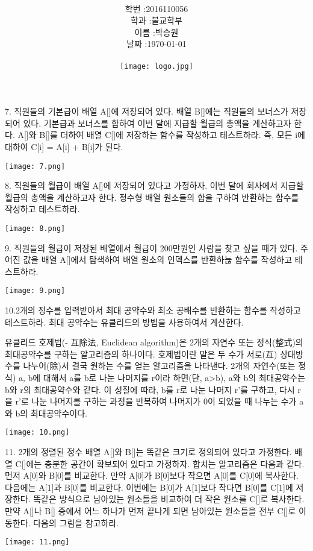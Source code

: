 \documentclass[11pt,a4paper]{article}
\title{
	\centering
	\pgfornament[width=12cm,color=teal]{84}\\
	\vspace{1cm}
	\fontsize{50}{50} \selectfont {기초 프로그래밍 실습\\11월 4주차}\\
		\pgfornament[width=12cm,color=teal]{88}\\
	\vfill}
\author{
	\LARGE
	\begin{tabular}{rl}
		\hline
		학번 : & 2016110056\\ 
		학과 : & 불교학부 \\
		이름 : & 박승원\\
		날짜 : & \today\\
		\hline
	\end{tabular}\vspace{2cm}
	\\
\texttt{[image: logo.jpg]}
	}
\date{}
\begin{document}
\maketitle
{}
\noindent
\lstset{language=C++, columns=flexible, tabsize=4, frame=shadowbox, showstringspaces=false, breaklines=true, upquote=true, basicstyle=\normalsize}
\begin{enumerate}
7. 직원들의 기본급이 배열 A[]에 저장되어 있다. 배열 B[]에는 직원들의 보너스가 저장되어 있다. 기본급과 보너스를 합하여 이번 달에 지급할 월급의 총액을 계산하고자 한다. A[]와 B[]를 더하여 배열 C[]에 저장하는 함수를 작성하고 테스트하라. 즉, 모든 i에 대하여 C[i] = A[i] + B[i]가 된다.

\texttt{[image: 7.png]}

8. 직원들의 월급이 배열 A[]에 저장되어 있다고 가정하자. 이번 달에 회사에서 지급할 월급의 총액을 계산하고자 한다. 정수형 배열 원소들의 합을 구하여 반환하는 함수를 작성하고 테스트하라.

\texttt{[image: 8.png]}

9. 직원들의 월급이 저장된 배열에서 월급이 200만원인 사람을 찾고 싶을 때가 있다. 주어진 값을 배열 A[]에서 탐색하여 배열 원소의 인덱스를 반환하늖 함수를 작성하고 테스트하라.

\texttt{[image: 9.png]}

10.2개의 정수를 입력받아서 최대 공약수와 최소 공배수를 반환하는 함수를 작성하고 테스트하라. 
최대 공약수는 유클리드의 방법을 사용하여서 계산한다.

유클리드 호제법(- 互除法, Euclidean algorithm)은 2개의 자연수 또는 정식(整式)의 최대공약수를 구하는 알고리즘의 하나이다. 
호제법이란 말은 두 수가 서로(互) 상대방 수를 나누어(除)서 결국 원하는 수를 얻는 알고리즘을 나타낸다. 2개의 자연수(또는 정식) a, b에 대해서 a를 b로 나눈 나머지를 r이라 하면(단, a>b), a와 b의 최대공약수는 b와 r의 최대공약수와 같다. 이 성질에 따라, b를 r로 나눈 나머지 r'를 구하고, 다시 r을 r'로 나눈 나머지를 구하는 과정을 반복하여 나머지가 0이 되었을 때 나누는 수가 a와 b의 최대공약수이다.

\texttt{[image: 10.png]}

11. 2개의 정렬된 정수 배열 A[]와 B[]는 똑같은 크기로 정의되어 있다고 가정한다. 
배열 C[]에는 충분한 공간이 확보되어 있다고 가정하자. 합치는 알고리즘은 다음과 같다. 
먼저 A[0]와 B[0]를 비교한다. 
만약 A[0]가 B[0]보다 작으면 A[0]를 C[0]에 복사한다.
다음에는 A[1]과 B[0]를 비교한다.
이번에는 B[0]가 A[1]보다 작다면 B[0]를 C[1]에 저장한다. 
똑같은 방식으로 남아있는 원소들을 비교하여 더 작은 원소를 C[]로 복사한다. 
만약 A[]나 B[] 중에서 어느 하나가 먼저 끝나게 되면 남아있는 원소들을 전부 C[]로 이동한다. 
다음의 그림을 참고하라.

\texttt{[image: 11.png]}

\end{enumerate}
\end{document}
